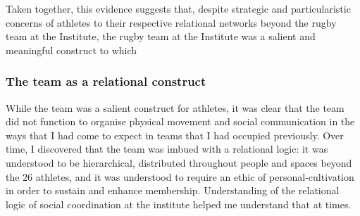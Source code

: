 \begin{CJK}{UTF8}{gbsn}
Taken together, this evidence suggests that, despite strategic and particularistic concerns of athletes to their respective relational networks beyond the rugby team at the Institute, the rugby team at the Institute was a salient and meaningful construct to which



\subsubsection{The team as a relational construct}


While the team was a salient construct for athletes, it was clear that the team did not function to organise physical movement and social communication in the ways that I had come to expect in teams that I had occupied previously.  Over time, I discovered that the team was imbued with a relational logic: it was understood to be hierarchical, distributed throughout people and spaces beyond the 26 athletes, and it was understood to require an ethic of personal-cultivation in order to sustain and enhance membership.  Understanding of the relational logic of social coordination at the institute helped me understand that at times.


\end{CJK}
